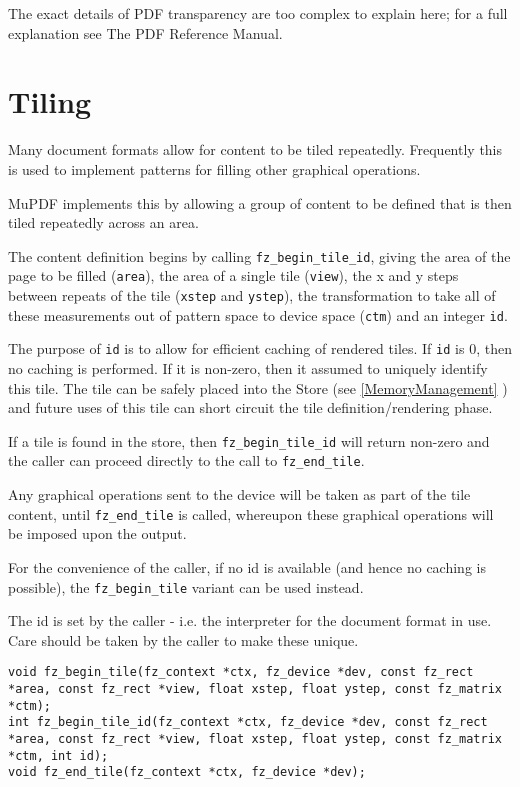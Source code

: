 \documentclass[oneside]{book}
\newcommand{\rjwref}[1] {\autoref{#1} \nameref{#1}}
\begin{document}
The exact details of PDF transparency are too complex to explain here; for a full explanation see The PDF Reference Manual.

\section{Tiling}

Many document formats allow for content to be tiled repeatedly. Frequently this is used to implement patterns for filling other graphical operations.

MuPDF implements this by allowing a group of content to be defined that is then tiled repeatedly across an area.

The content definition begins by calling \texttt{fz\_begin\_tile\_id}, giving the area of the page to be filled (\texttt{area}), the area of a single tile (\texttt{view}), the x and y steps between repeats of the tile (\texttt{xstep} and \texttt{ystep}), the transformation to take all of these measurements out of pattern space to device space (\texttt{ctm}) and an integer \texttt{id}.

The purpose of \texttt{id} is to allow for efficient caching of rendered tiles. If  \texttt{id} is 0, then no caching is performed. If it is non-zero, then it assumed to uniquely identify this tile. The tile can be safely placed into the Store (see \rjwref{MemoryManagement}) and future uses of this tile can short circuit the tile definition\slash rendering phase.

If a tile is found in the store, then \texttt{fz\_begin\_tile\_id} will return non-zero and the caller can proceed directly to the call to \texttt{fz\_end\_tile}.

Any graphical operations sent to the device will be taken as part of the tile content, until \texttt{fz\_end\_tile} is called, whereupon these graphical operations will be imposed upon the output.

For the convenience of the caller, if no id is available (and hence no caching is possible), the \texttt{fz\_begin\_tile} variant can be used instead.

The id is set by the caller - i.e. the interpreter for the document format in use. Care should be taken by the caller to make these unique.


\begin{lstlisting}
void fz_begin_tile(fz_context *ctx, fz_device *dev, const fz_rect *area, const fz_rect *view, float xstep, float ystep, const fz_matrix *ctm);
int fz_begin_tile_id(fz_context *ctx, fz_device *dev, const fz_rect *area, const fz_rect *view, float xstep, float ystep, const fz_matrix *ctm, int id);
void fz_end_tile(fz_context *ctx, fz_device *dev);
\end{lstlisting}
\end{document}
